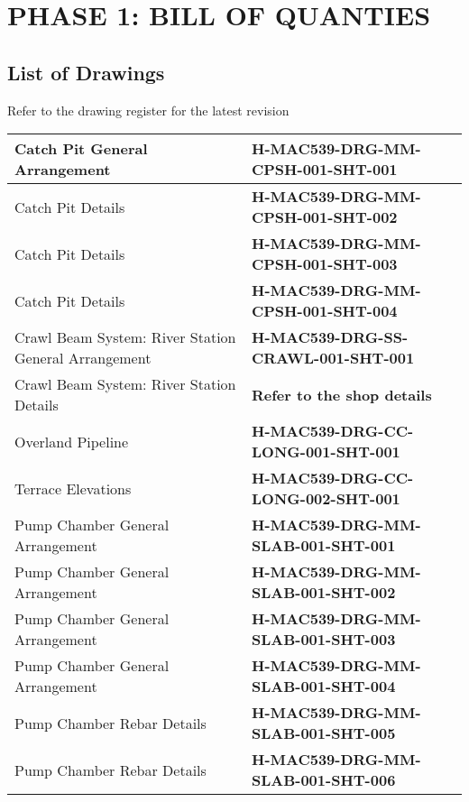 \documentclass{article}%
\begin{document}
%
\section{PHASE 1: BILL OF QUANTIES}%
\label{sec:PHASE1BILLOFQUANTIES}%
\subsection{List of Drawings}%
\label{subsec:ListofDrawings}%
Refer to the drawing register for the latest revision%
\begin{flushleft}%
\begin{minipage}{\textwidth}%
\flushleft%
\begin{tabular}{|l |l |}%
\hline%
Catch Pit General Arrangement&\textbf{H{-}MAC539{-}DRG{-}MM{-}CPSH{-}001{-}SHT{-}001}\\%
\hline%
Catch Pit Details&\textbf{H{-}MAC539{-}DRG{-}MM{-}CPSH{-}001{-}SHT{-}002}\\%
\hline%
Catch Pit Details&\textbf{H{-}MAC539{-}DRG{-}MM{-}CPSH{-}001{-}SHT{-}003}\\%
\hline%
Catch Pit Details&\textbf{H{-}MAC539{-}DRG{-}MM{-}CPSH{-}001{-}SHT{-}004}\\%
\hline%
Crawl Beam System: River Station General Arrangement&\textbf{H{-}MAC539{-}DRG{-}SS{-}CRAWL{-}001{-}SHT{-}001}\\%
\hline%
Crawl Beam System: River Station Details&\textbf{Refer to the shop details}\\%
\hline%
Overland Pipeline&\textbf{H{-}MAC539{-}DRG{-}CC{-}LONG{-}001{-}SHT{-}001}\\%
\hline%
Terrace Elevations&\textbf{H{-}MAC539{-}DRG{-}CC{-}LONG{-}002{-}SHT{-}001}\\%
\hline%
Pump Chamber General Arrangement&\textbf{H{-}MAC539{-}DRG{-}MM{-}SLAB{-}001{-}SHT{-}001}\\%
\hline%
Pump Chamber General Arrangement&\textbf{H{-}MAC539{-}DRG{-}MM{-}SLAB{-}001{-}SHT{-}002}\\%
\hline%
Pump Chamber General Arrangement&\textbf{H{-}MAC539{-}DRG{-}MM{-}SLAB{-}001{-}SHT{-}003}\\%
\hline%
Pump Chamber General Arrangement&\textbf{H{-}MAC539{-}DRG{-}MM{-}SLAB{-}001{-}SHT{-}004}\\%
\hline%
Pump Chamber Rebar Details&\textbf{H{-}MAC539{-}DRG{-}MM{-}SLAB{-}001{-}SHT{-}005}\\%
\hline%
Pump Chamber Rebar Details&\textbf{H{-}MAC539{-}DRG{-}MM{-}SLAB{-}001{-}SHT{-}006}\\%
\hline%

\end{tabular}
\end{minipage}
\end{flushleft}
\end{document}

